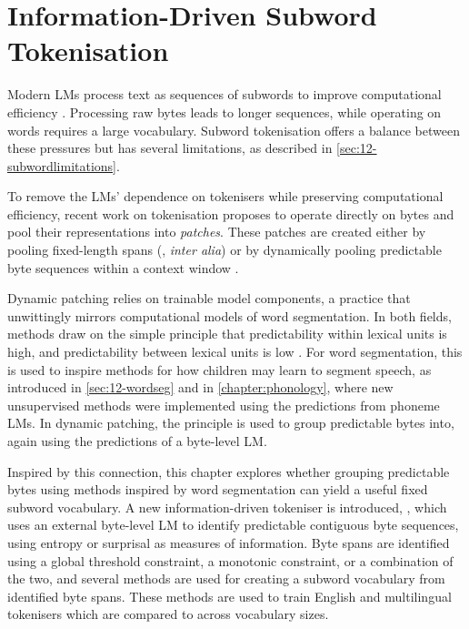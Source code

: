 \chapter{Information-Driven Subword Tokenisation}\label{chapter:infotokenisation}


Modern LMs process text as sequences of subwords to improve computational efficiency \citep{zouhar-etal-2023-tokenization}. Processing raw bytes leads to longer sequences, while operating on words requires a large vocabulary. Subword tokenisation offers a balance between these pressures but has several limitations, as described in \cref{sec:12-subwordlimitations}.

To remove the LMs' dependence on tokenisers while preserving computational efficiency, recent work on tokenisation proposes to operate directly on bytes and pool their representations into \textit{patches}. These patches are created either by pooling fixed-length spans (\citealp{dai-etal-2020-funnel, nawrot-etal-2022-hierarchical, yu2023megabyte}, \textit{inter alia}) or by dynamically pooling predictable byte sequences within a context window \citep{nawrot-etal-2023-efficient, pagnoni2024byte}.

Dynamic patching relies on trainable model components, a practice that unwittingly mirrors computational models of word segmentation. In both fields, methods draw on the simple principle that predictability within lexical units is high, and predictability between lexical units is low \citep{harris1955}. For word segmentation, this is used to inspire methods for how children may learn to segment speech, as introduced in \cref{sec:12-wordseg} and in \cref{chapter:phonology}, where new unsupervised methods were implemented using the predictions from phoneme LMs. In dynamic patching, the principle is used to group predictable bytes into, again using the predictions of a byte-level LM. 

Inspired by this connection, this chapter explores whether grouping predictable bytes using methods inspired by word segmentation can yield a useful fixed subword vocabulary. A new information-driven tokeniser is introduced, \tokname, which uses an external byte-level LM to identify predictable contiguous byte sequences, using entropy or surprisal as measures of information. Byte spans are identified using a global threshold constraint, a monotonic constraint, or a combination of the two, and several methods are used for creating a subword vocabulary from identified byte spans. These methods are used to train English and multilingual tokenisers which are compared to \bpe across vocabulary sizes. 

